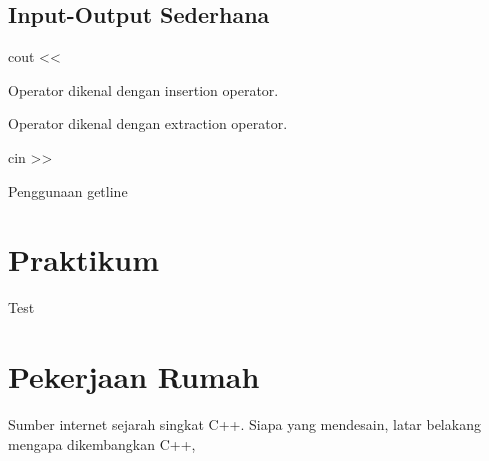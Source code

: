 \documentclass[a4paper,11pt,bahasa]{article} %
\begin{document}
\subsection{Input-Output Sederhana}

\begin{cppcode}
cout << 
\end{cppcode}

Operator \cppinline{<<} dikenal dengan insertion operator.

Operator \cppinline{>>} dikenal dengan extraction operator.

\begin{cppcode}
cin >>
\end{cppcode}

Penggunaan getline


\section{Praktikum}

Test



\section{Pekerjaan Rumah}

\begin{soal}[Sejarah C++]
Sumber internet sejarah singkat C++.
Siapa yang mendesain, latar belakang mengapa dikembangkan C++,
\end{soal}


\begin{soal}
\end{soal}




\end{document}
